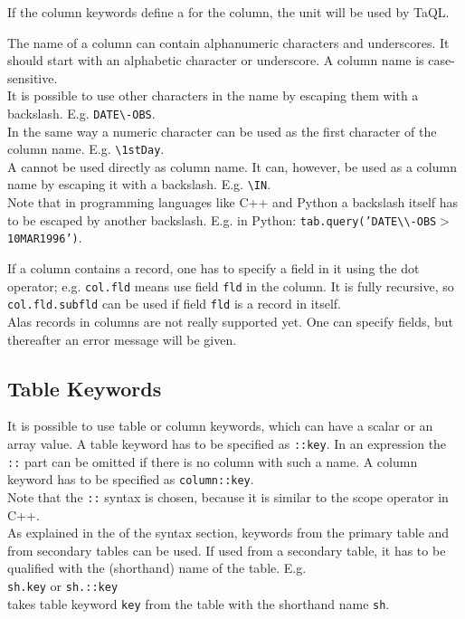 If the column keywords define a  for the
column, the unit will be used by TaQL.

The name of a column can contain alphanumeric characters and underscores.
It should start with an alphabetic character or underscore.
A column name is case-sensitive.
\\It is possible to use other characters in the name by
escaping them with a backslash. E.g. \texttt{DATE}\verb+\+\texttt{-OBS}.
\\In the same way a numeric character can be used as the first
character of the column name. E.g. \verb+\+\texttt{1stDay}.
\\
A   cannot
be used directly as column name.
It can, however, be used as a column name by escaping
it with a backslash. E.g. \verb+\+\texttt{IN}.
\\Note that in programming languages like C++ and Python a backslash
itself has to be escaped by another backslash. E.g. in Python:
\texttt{tab.query('DATE}\verb+\\+\texttt{-OBS$>$10MAR1996')}.

If a column contains a record, one has to specify a field in it
using the dot operator; e.g. \texttt{col.fld} means use field
\texttt{fld} in the column. It is fully recursive, so
\texttt{col.fld.subfld} can be used if field \texttt{fld} is a record
in itself.
\\Alas records in columns are not really supported yet. One can specify
fields, but thereafter an error message will be given.

\subsection{\label{TAQL:KEYWORDS}Table Keywords}
It is possible to use table or column keywords, which can have
a scalar or an array value. A table keyword has to be specified
as \texttt{::key}. In an expression the \texttt{::} part can be omitted
if there is no column with such a name.
A column keyword has to be specified as \texttt{column::key}.
\\Note that the \texttt{::} syntax is chosen, because it is similar
to the scope operator in C++.
\\
As explained in the  of the syntax
section, keywords from the primary table and from secondary tables
can be used. If used from a secondary table, it has to be qualified
with the (shorthand) name of the table. E.g.
\\\texttt{sh.key} or \texttt{sh.::key}
\\takes table keyword \texttt{key} from the table with the shorthand name
\texttt{sh}.

